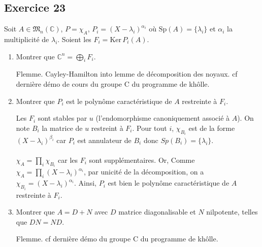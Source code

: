 \documentclass[a4paper,12pt]{article}
\begin{document}
    \subsection*{Exercice 23}
    Soit \( A \in \mathfrak{M}_{n}(\mathbb{C}) \), \( P = \chi_{A} \), \( P_{i} = (X - \lambda_{i})^{\alpha_{i}} \) où \( \mathrm{Sp}(A) = \{\lambda_{i}\} \) et \( \alpha_{i} \) la multiplicité de \( \lambda_{i} \).  
    Soient les \( F_{i} = \mathrm{Ker} \, P_{i}(A) \).
    
    \begin{enumerate}
    \item Montrer que \( \mathbb{C}^{n} = \bigoplus_{i} F_{i} \).
    
    \begin{correctionbox}
        Flemme. Cayley-Hamilton into lemme de décomposition des noyaux. cf dernière démo de cours du groupe C du programme de khôlle.
    \end{correctionbox}
    
    \item Montrer que \( P_{i} \) est le polynôme caractéristique de \( A \) restreinte à \( F_{i} \).
    
    \begin{correctionbox}
        Les \( F_{i} \) sont stables par \( u \) (l'endomorphisme canoniquement associé à \( A \)).  
        On note \( B_{i} \) la matrice de \( u \) restreint à \( F_{i} \). Pour tout \( i \), \( \chi_{B_{i}} \) est de la forme \( (X - \lambda_{i})^{\beta_{i}} \) car \(    P_{i}\) est annulateur de \( B_{i} \) donc \( Sp(B_{i}) = \{\lambda_{i}\} \).\\\\ 
        \( \chi_{A} = \prod_{i} \chi_{B_{i}} \) car les \(F_{i}\) sont supplémentaires.  
        Or,   
        Comme \( \chi_{A} = \prod_{i} (X - \lambda_{i})^{\alpha_{i}} \), par unicité de la décomposition, on a \( \chi_{B_{i}} = (X - \lambda_{i})^{\alpha_{i}} \).  
        Ainsi, \( P_{i} \) est bien le polynôme caractéristique de \( A \) restreinte à \( F_{i} \).
    \end{correctionbox}
    
    \item Montrer que \( A = D + N \) avec \( D \) matrice diagonalisable et \( N \) nilpotente, telles que \( DN = ND \).
    
    \begin{correctionbox}
        Flemme. cf dernière démo du groupe C du programme de khôlle.
    \end{correctionbox}
    

\end{enumerate}
\end{document}
